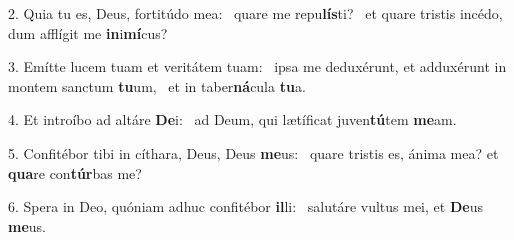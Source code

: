 2. Quia tu es, Deus, fortitúdo mea: \dag\  quare me repu\textbf{lís}ti? \ast\  et quare tristis incédo, dum afflígit me \textbf{in}i\textbf{mí}cus?\

3. Emítte lucem tuam et veritátem tuam: \dag\  ipsa me deduxérunt, et adduxérunt in montem sanctum \textbf{tu}um, \ast\  et in taber\textbf{ná}cula \textbf{tu}a.\

4. Et introíbo ad altáre \textbf{De}i: \ast\  ad Deum, qui lætíficat juven\textbf{tú}tem \textbf{me}am.\

5. Confitébor tibi in cíthara, Deus, Deus \textbf{me}us: \ast\  quare tristis es, ánima mea? et \textbf{qua}re con\textbf{túr}bas me?\

6. Spera in Deo, quóniam adhuc confitébor \textbf{il}li: \ast\  salutáre vultus mei, et \textbf{De}us \textbf{me}us.\

